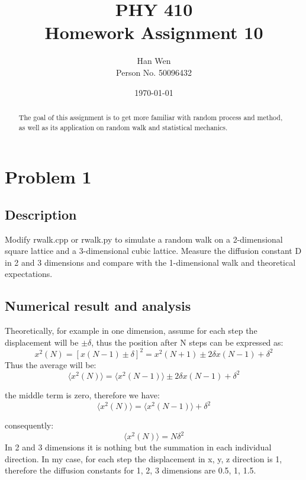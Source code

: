 \documentclass[11pt,letterpaper]{article}
\begin{document}
\title{PHY 410 \\ Homework Assignment 10}
\author{Han Wen \\ \tiny Person No. 50096432}
\date{\today}

\maketitle

\begin{abstract}
The goal of this assignment is to get more familiar with random process and method, as well as its application on random walk and statistical mechanics.


\end{abstract}

\tableofcontents

\newpage
\section{Problem 1}

\subsection{Description}

Modify rwalk.cpp or rwalk.py to simulate a random walk on a 2-dimensional square lattice and a 3-dimensional cubic lattice. Measure the diffusion constant D in 2 and 3 dimensions and compare with the 1-dimensional walk and theoretical expectations.

\subsection{Numerical result and analysis}


Theoretically, for example in one dimension, assume for each step the displacement will be $\pm\delta$, thus the position after N steps can be expressed as:
$$
x^2(N)=[x(N-1)\pm\delta]^2 = x^2(N+1) \pm 2\delta{x}(N-1)+{\delta}^2
$$
Thus the average will be:
$$
\big \langle {x^2(N)} \big \rangle= \big \langle {x^2(N-1)} \big \rangle \pm 2{\delta}x(N-1) + {\delta}^2
$$

the middle term is zero, therefore we have:
$$
\big \langle {x^2(N)} \big \rangle= \big \langle {x^2(N-1)} \big \rangle + {\delta}^2
$$

consequently:
$$
\big \langle {x^2(N)} \big \rangle= N{\delta}^2
$$
In 2 and 3 dimensions it is nothing but the summation in each individual direction. 
In my case, for each step the displacement in x, y, z direction is 1, therefore the diffusion constants for 1, 2, 3 dimensions are 0.5, 1, 1.5.
\end{document}
